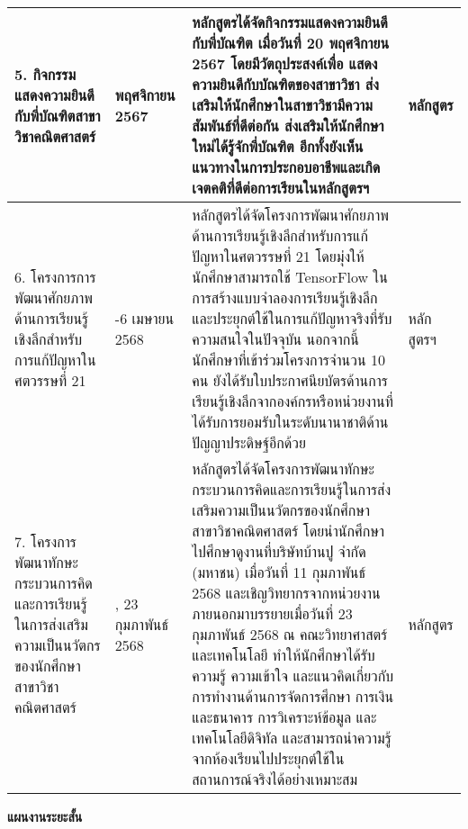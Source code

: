 \begin{longtable}{|>{\raggedright}p{}|>{\centering}p{}|>{\raggedright}p{}|>{\centering\arraybackslash}p{}|}
	5.	กิจกรรมแสดงความยินดีกับพี่บัณฑิตสาขาวิชาคณิตศาสตร์   &  20 พฤศจิกายน 2567 
	& หลักสูตรได้จัดกิจกรรมแสดงความยินดีกับพี่บัณฑิต เมื่อวันที่ 20 พฤศจิกายน 2567 โดยมีวัตถุประสงค์เพื่อ แสดงความยินดีกับบัณฑิตของสาขาวิชา ส่งเสริมให้นักศึกษาในสาขาวิชามีความสัมพันธ์ที่ดีต่อกัน ส่งเสริมให้นักศึกษาใหม่ได้รู้จักพี่บัณฑิต อีกทั้งยังเห็นแนวทางในการประกอบอาชีพและเกิดเจตคติที่ดีต่อการเรียนในหลักสูตรฯ & หลักสูตร \\ \hline
	6.	โครงการการพัฒนาศักยภาพด้านการเรียนรู้เชิงลึกสำหรับการแก้ปัญหาในศตวรรษที่ 21   & 5-6 เมษายน 2568 
	& หลักสูตรได้จัดโครงการพัฒนาศักยภาพด้านการเรียนรู้เชิงลึกสำหรับการแก้ปัญหาในศตวรรษที่ 21 โดยมุ่งให้นักศึกษาสามารถใช้ TensorFlow ในการสร้างแบบจำลองการเรียนรู้เชิงลึก และประยุกต์ใช้ในการแก้ปัญหาจริงที่รับความสนใจในปัจจุบัน  นอกจากนี้ นักศึกษาที่เข้าร่วมโครงการจำนวน 10 คน ยังได้รับใบประกาศนียบัตรด้านการเรียนรู้เชิงลึกจากองค์กรหรือหน่วยงานที่ได้รับการยอมรับในระดับนานาชาติด้านปัญญาประดิษฐ์อีกด้วย &  หลักสูตรฯ \\ \hline
	7.	โครงการพัฒนาทักษะกระบวนการคิดและการเรียนรู้ในการส่งเสริมความเป็นนวัตกรของนักศึกษาสาขาวิชาคณิตศาสตร์  & 11, 23 กุมภาพันธ์ 2568 
	& หลักสูตรได้จัดโครงการพัฒนาทักษะกระบวนการคิดและการเรียนรู้ในการส่งเสริมความเป็นนวัตกรของนักศึกษาสาขาวิชาคณิตศาสตร์
	โดยนำนักศึกษาไปศึกษาดูงานที่บริษัทบ้านปู จำกัด (มหาชน) เมื่อวันที่ 11 กุมภาพันธ์ 2568 และเชิญวิทยากรจากหน่วยงานภายนอกมาบรรยายเมื่อวันที่ 23 กุมภาพันธ์ 2568 ณ คณะวิทยาศาสตร์และเทคโนโลยี ทำให้นักศึกษาได้รับความรู้ ความเข้าใจ และแนวคิดเกี่ยวกับการทำงานด้านการจัดการศึกษา การเงินและธนาคาร การวิเคราะห์ข้อมูล และเทคโนโลยีดิจิทัล และสามารถนำความรู้จากห้องเรียนไปประยุกต์ใช้ในสถานการณ์จริงได้อย่างเหมาะสม& หลักสูตร\\\hline
\end{longtable}


\noindent
\textbf{แผนงานระยะสั้น}

